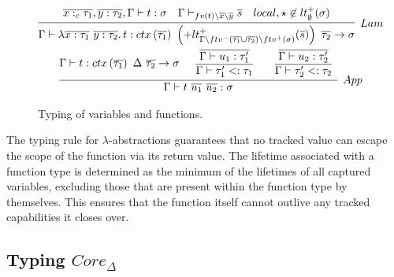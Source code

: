 \documentclass[11pt]{article}
\newcommand{\ap}{~}
\newcommand{\ctx}[1]{ctx\left(#1\right)~}
\begin{document}
    \begin{figure}
        \begin{gather*}
            \infer[Lam]{
                \Gamma\vdash \lambda \overline{x : \tau_1} ~ \overline{y : \tau_2} \ldotp t : \ctx{\overline{\tau_1}} \left(+{lt_{\Gamma\setminus ftv^-(\overline{\tau_1}\cup\overline{\tau_2}) \setminus ftv^+(\sigma)}^+(\overline{s})}\right)~ \overline{\tau_2} \to \sigma
            }{
                \overline{x :_c \tau_1}, \overline{y : \tau_2}, \Gamma\vdash t : \sigma
                &
                \Gamma\vdash_{fv(t)\setminus \overline{x}\setminus\overline{y}}\overline{s}
                &
                local, \star \not\in lt_\emptyset^+(\sigma)
            } \\
            \infer[App]{
                \Gamma\vdash t \ap \overline{u_1} \ap \overline{u_2} : \sigma
            } {
                \Gamma\vdash t : \ctx{\overline{\tau_1}} \Delta~\overline{\tau_2}\to\sigma
                &
                \begin{array}{c}
                    \overline{\Gamma\vdash u_1 : \tau_1'} \\
                    \overline{\Gamma\vdash\tau_1' <: \tau_1}
                \end{array}
                &
                \begin{array}{c}
                    \overline{\Gamma\vdash u_2 : \tau_2'} \\
                    \overline{\Gamma\vdash\tau_2' <: \tau_2}
                \end{array}
            }
        \end{gather*}
        \caption{Typing of variables and functions.}
    \end{figure}

    The typing rule for $\lambda$-abstractions guarantees that no tracked value can escape the scope of the function via its return value.
    The lifetime associated with a function type is determined as the minimum of the lifetimes of all captured variables, excluding those that are present within the function type by themselves.
    This ensures that the function itself cannot outlive any tracked capabilities it closes over.

    \subsection{Typing $Core_\Delta$}
\end{document}
